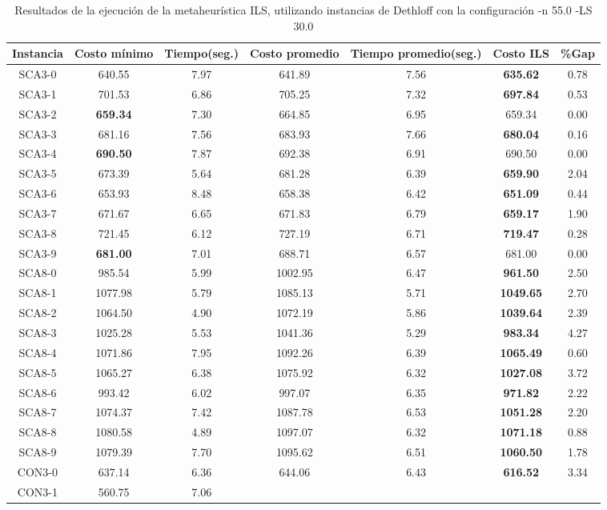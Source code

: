 \begin{table}[ht]
\caption{Resultados de la ejecución de la metaheurística ILS, utilizando instancias de Dethloff con la configuración -n 55.0 -LS 30.0}
\centering
\small
\begin{tabular}{c c c c c c c}
\hline\hline
Instancia & Costo mínimo & Tiempo(seg.) & Costo promedio & Tiempo promedio(seg.) & Costo ILS & \%Gap \\ [0.5ex]
\hline
SCA3-0 & 640.55 & 7.97 & 
641.89 & 7.56 & \bf{635.62} & 
0.78\\SCA3-1 & 701.53 & 6.86 & 
705.25 & 7.32 & \bf{697.84} & 
0.53\\SCA3-2 & \bf{659.34} & 7.30 & 
664.85 & 6.95 & 659.34 & 0.00\\
SCA3-3 & 681.16 & 7.56 & 
683.93 & 7.66 & \bf{680.04} & 
0.16\\SCA3-4 & \bf{690.50} & 7.87 & 
692.38 & 6.91 & 690.50 & 0.00\\
SCA3-5 & 673.39 & 5.64 & 
681.28 & 6.39 & \bf{659.90} & 
2.04\\SCA3-6 & 653.93 & 8.48 & 
658.38 & 6.42 & \bf{651.09} & 
0.44\\SCA3-7 & 671.67 & 6.65 & 
671.83 & 6.79 & \bf{659.17} & 
1.90\\SCA3-8 & 721.45 & 6.12 & 
727.19 & 6.71 & \bf{719.47} & 
0.28\\SCA3-9 & \bf{681.00} & 7.01 & 
688.71 & 6.57 & 681.00 & 0.00\\
SCA8-0 & 985.54 & 5.99 & 
1002.95 & 6.47 & \bf{961.50} & 
2.50\\SCA8-1 & 1077.98 & 5.79 & 
1085.13 & 5.71 & \bf{1049.65} & 
2.70\\SCA8-2 & 1064.50 & 4.90 & 
1072.19 & 5.86 & \bf{1039.64} & 
2.39\\SCA8-3 & 1025.28 & 5.53 & 
1041.36 & 5.29 & \bf{983.34} & 
4.27\\SCA8-4 & 1071.86 & 7.95 & 
1092.26 & 6.39 & \bf{1065.49} & 
0.60\\SCA8-5 & 1065.27 & 6.38 & 
1075.92 & 6.32 & \bf{1027.08} & 
3.72\\SCA8-6 & 993.42 & 6.02 & 
997.07 & 6.35 & \bf{971.82} & 
2.22\\SCA8-7 & 1074.37 & 7.42 & 
1087.78 & 6.53 & \bf{1051.28} & 
2.20\\SCA8-8 & 1080.58 & 4.89 & 
1097.07 & 6.32 & \bf{1071.18} & 
0.88\\SCA8-9 & 1079.39 & 7.70 & 
1095.62 & 6.51 & \bf{1060.50} & 
1.78\\CON3-0 & 637.14 & 6.36 & 
644.06 & 6.43 & \bf{616.52} & 
3.34\\CON3-1 & 560.75 & 7.06 & 

\end{tabular}
\end{table}
